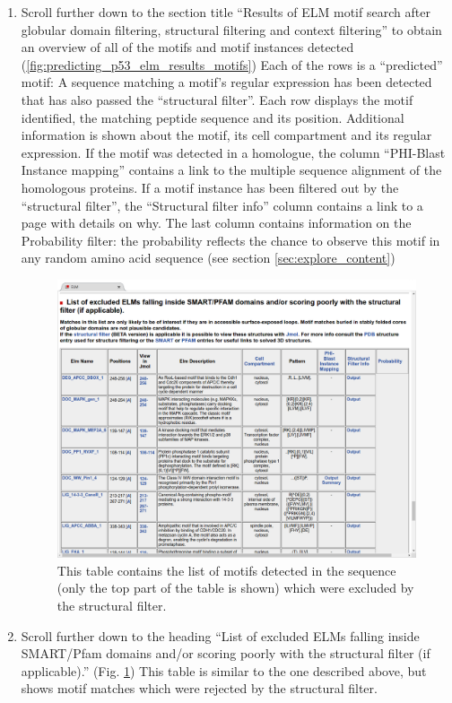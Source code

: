 \begin{enumerate}
\item Scroll further down to the section title ``Results of ELM motif search
	after globular domain filtering, structural filtering and context
	filtering'' to obtain an overview of all of the motifs and motif
	instances detected
	(\ref{fig:predicting_p53_elm_results_motifs})
	Each of the rows is a ``predicted'' motif: A sequence matching a
	motif's regular expression has been detected that has also passed the
	``structural filter''.
	Each row displays the motif identified, the matching peptide
	sequence and its position. Additional information is shown about the
	motif, its cell compartment and its regular expression. If the motif
	was detected in a homologue, the column ``PHI-Blast Instance
	mapping'' contains a link to the multiple sequence alignment of the
	homologous proteins. If a motif instance has been filtered out 
	by the ``structural filter'', the ``Structural filter info'' column
	contains a link to a page with details on why.
	The last column contains information on the Probability filter: the
	probability reflects the chance to observe this motif in any random
	amino acid sequence (see section \ref{sec:explore_content})

\begin{figure}[h!]
\centering
	\includegraphics[width=\textwidth]{Figures/predicting_p53/elm_results_motifs_filtered.png}
	\caption{
	This table contains the list of motifs detected in the sequence (only
	the top part of the table is shown) which were excluded by the
	structural filter.
	}
	\label{fig:predicting_p53_elm_results_motifs_filtered}
\end{figure}

\item Scroll further down to the heading ``List of excluded ELMs falling inside
	SMART/Pfam domains and/or scoring poorly with the structural filter (if
	applicable).''
	(Fig.  \ref{fig:predicting_p53_elm_results_motifs_filtered})
	This table is similar to the one described above, but shows motif
	matches which were rejected by the structural filter.
	
\end{enumerate}
